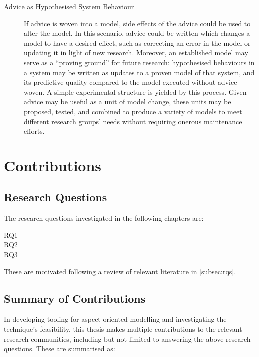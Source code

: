 \begin{description}
  \item[Advice as Hypothesised System Behaviour] If advice is woven into a
  model, side effects of the advice could be used to alter the model. In this
  scenario, advice could be written which changes a model to have a desired
  effect, such as correcting an error in the model or updating it in light of
  new research. Moreover, an established model may serve as a ``proving ground''
  for future research: hypothesised behaviours in a system may be written as
  updates to a proven model of that system, and its predictive quality compared
  to the model executed without advice woven. A simple experimental structure is
  yielded by this process. Given advice may be useful as a unit of model change,
  these units may be proposed, tested, and combined to produce a variety of
  models to meet different research groups' needs without requiring onerous
  maintenance efforts.
\end{description}




\section{Contributions}
\label{intro_contributions}

\subsection{Research Questions}
\label{intro_rqs}

The research questions investigated in the following chapters are: 

\begin{researchquestion}
\begin{description}
\item[RQ1] \rqtwo{}
\item[RQ2] \rqthree{}
\item[RQ3] \rqfour{}
\end{description}
\end{researchquestion}

These are motivated following a review of relevant literature in \cref{subsec:rqs}.

\subsection{Summary of Contributions}

In developing tooling for aspect-oriented modelling and investigating the
technique's feasibility, this thesis makes multiple contributions to the
relevant research communities, including but not limited to answering the above
research questions. These are summarised as:

